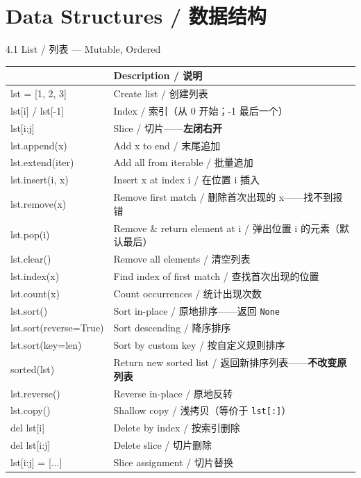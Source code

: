 \documentclass[11pt,a4paper]{report}
\let\oldtexttt\texttt
\renewcommand{\texttt}[1]{\textcolor{mainblue}{\oldtexttt{#1}}}
\begin{document}
\newpage

\chapter{Data Structures / 数据结构}

\begin{cmdsection}{4.1  List / 列表 — Mutable, Ordered}
\normalsize\renewcommand{\arraystretch}{1.4}
\centering
\begin{tabularx}{\textwidth}{@{}>{\ttfamily}l>{\raggedright\arraybackslash}X@{}}
\toprule
\multicolumn{1}{@{}l}{\textbf{Syntax}} & \textbf{Description / 说明} \\ \midrule
lst = [1, 2, 3]             & Create list / 创建列表 \\
lst[i] / lst[-1]            & Index / 索引（从 0 开始；-1 最后一个） \\
lst[i:j]                    & Slice / 切片——\textbf{左闭右开} \\
lst.append(x)               & Add x to end / 末尾追加 \\
lst.extend(iter)            & Add all from iterable / 批量追加 \\
lst.insert(i, x)            & Insert x at index i / 在位置 i 插入 \\
lst.remove(x)               & Remove first match / 删除首次出现的 x——找不到报错 \\
lst.pop(i)                  & Remove \& return element at i / 弹出位置 i 的元素（默认最后） \\
lst.clear()                 & Remove all elements / 清空列表 \\
lst.index(x)                & Find index of first match / 查找首次出现的位置 \\
lst.count(x)                & Count occurrences / 统计出现次数 \\
lst.sort()                  & Sort in-place / 原地排序——返回 \texttt{None} \\
lst.sort(reverse=True)      & Sort descending / 降序排序 \\
lst.sort(key=len)           & Sort by custom key / 按自定义规则排序 \\
sorted(lst)                 & Return new sorted list / 返回新排序列表——\textbf{不改变原列表} \\
lst.reverse()               & Reverse in-place / 原地反转 \\
lst.copy()                  & Shallow copy / 浅拷贝（等价于 \texttt{lst[:]}） \\
del lst[i]                  & Delete by index / 按索引删除 \\
del lst[i:j]                & Delete slice / 切片删除 \\
lst[i:j] = [...]            & Slice assignment / 切片替换 \\
\bottomrule
\end{tabularx}
\end{cmdsection}
\end{document}
